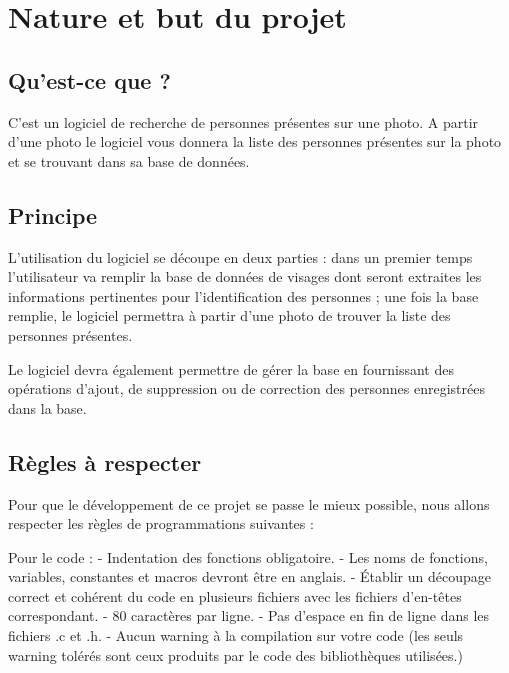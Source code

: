 \documentclass[12pt,a4paper]{article}
\begin{document}
\newpage
\section{Nature et but du projet}
\subsection{Qu'est-ce que ?}
C'est un logiciel de recherche de personnes présentes sur une photo. A partir d'une photo le logiciel vous donnera la liste des personnes présentes sur la photo et se trouvant dans sa base de données.

\subsection{Principe}
L'utilisation du logiciel se découpe en deux parties : dans un premier temps l'utilisateur va remplir la base de données de visages dont seront extraites les informations pertinentes pour l'identification des personnes ; une fois la base remplie, le logiciel permettra à partir d'une photo de trouver la liste des personnes présentes.

Le logiciel devra également permettre de gérer la base en fournissant des opérations d'ajout, de suppression ou de correction des personnes enregistrées dans la base.

\subsection{Règles à respecter}

Pour que le développement de ce projet se passe le mieux possible, nous allons respecter les règles de programmations suivantes :

Pour le code :
\newline
- Indentation des fonctions obligatoire.
\newline
- Les noms de fonctions, variables, constantes et macros devront être en anglais.
\newline
- Établir un découpage correct et cohérent du code en plusieurs fichiers avec les fichiers d'en-têtes correspondant.
\newline
- 80 caractères par ligne.
\newline
- Pas d'espace en fin de ligne dans les fichiers .c et .h.
\newline
- Aucun warning à la compilation sur votre code (les seuls warning tolérés sont ceux produits par le code des bibliothèques utilisées.)
\end{document}
